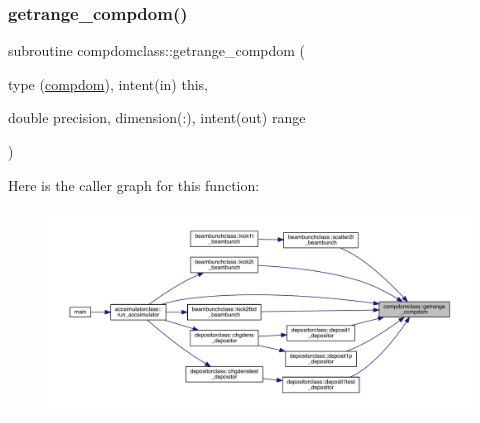 \subsubsection{\texorpdfstring{getrange\_compdom()}{getrange\_compdom()}}
{\footnotesize\ttfamily subroutine compdomclass\+::getrange\+\_\+compdom (\begin{DoxyParamCaption}\item[{type (\mbox{\hyperlink{namespacecompdomclass_structcompdomclass_1_1compdom}{compdom}}), intent(in)}]{this,  }\item[{double precision, dimension(\+:), intent(out)}]{range }\end{DoxyParamCaption})}

Here is the caller graph for this function\+:\nopagebreak
\begin{figure}[H]
\begin{center}
\leavevmode
\includegraphics[width=350pt]{namespacecompdomclass_acba710aa1017492e05a537273742cc16_icgraph}
\end{center}
\end{figure}
\mbox{\label{namespacecompdomclass_acdfdc48f4091ad70b76c1c7ed66c10b0}} 
